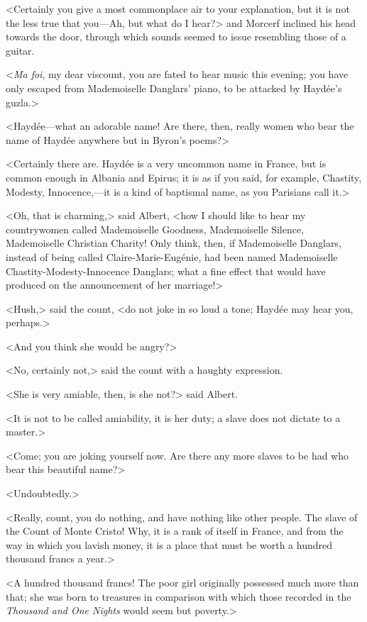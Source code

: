  <Certainly you give a most commonplace air to your explanation, but it is not the less true that you—Ah, but what do I hear?> and Morcerf inclined his head towards the door, through which sounds seemed to issue resembling those of a guitar. 

 <\textit{Ma foi}, my dear viscount, you are fated to hear music this evening; you have only escaped from Mademoiselle Danglars' piano, to be attacked by Haydée's guzla.> 

 <Haydée—what an adorable name! Are there, then, really women who bear the name of Haydée anywhere but in Byron's poems?> 

 <Certainly there are. Haydée is a very uncommon name in France, but is common enough in Albania and Epirus; it is as if you said, for example, Chastity, Modesty, Innocence,—it is a kind of baptismal name, as you Parisians call it.> 

 <Oh, that is charming,> said Albert, <how I should like to hear my countrywomen called Mademoiselle Goodness, Mademoiselle Silence, Mademoiselle Christian Charity! Only think, then, if Mademoiselle Danglars, instead of being called Claire-Marie-Eugénie, had been named Mademoiselle Chastity-Modesty-Innocence Danglars; what a fine effect that would have produced on the announcement of her marriage!> 

 <Hush,> said the count, <do not joke in so loud a tone; Haydée may hear you, perhaps.> 

 <And you think she would be angry?> 

 <No, certainly not,> said the count with a haughty expression. 

 <She is very amiable, then, is she not?> said Albert. 

 <It is not to be called amiability, it is her duty; a slave does not dictate to a master.> 

 <Come; you are joking yourself now. Are there any more slaves to be had who bear this beautiful name?> 

 <Undoubtedly.> 

 <Really, count, you do nothing, and have nothing like other people. The slave of the Count of Monte Cristo! Why, it is a rank of itself in France, and from the way in which you lavish money, it is a place that must be worth a hundred thousand francs a year.> 

 <A hundred thousand francs! The poor girl originally possessed much more than that; she was born to treasures in comparison with which those recorded in the \textit{Thousand and One Nights} would seem but poverty.> 

